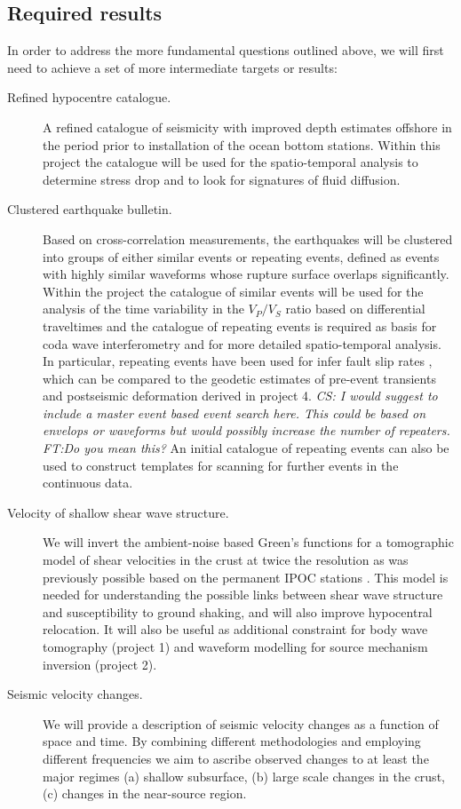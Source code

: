 \documentclass[11pt]{article}
\newcommand{\note}[1]{{\it \color{red} #1}}
\newcommand{\noteft}[1]{{\it \color{magenta} FT:#1}}
\newcommand{\note}[1]{}
\newcommand{\noteft}[1]{}
\begin{document}
\subsection*{Required results}
In order to address the more fundamental questions outlined above, we will first need to achieve a set of more intermediate targets or results:
\begin{description}
 \item[Refined hypocentre catalogue.] A refined catalogue of seismicity with improved depth estimates offshore in the period prior to installation of the ocean bottom stations.  Within this project the catalogue will be used for the spatio-temporal analysis to determine stress drop and to look for signatures of fluid diffusion.
 \item[Clustered earthquake bulletin.] Based on cross-correlation measurements, the earthquakes will be clustered into groups of either similar events or repeating events, defined as events with highly similar waveforms whose rupture surface overlaps significantly. Within the project the catalogue of similar events will be used for the analysis of the time variability in the $V_P/V_S$ ratio based on differential traveltimes and the catalogue of repeating events is required as basis for coda wave interferometry and for more detailed spatio-temporal analysis. In particular, repeating events have been used for infer fault slip rates \citep{nadeau:1998,uchida04}, which can be compared to the  geodetic estimates of pre-event transients and postseismic deformation derived in project 4. \note{CS: I would suggest to include a master event based event search here. This could be based on envelops or waveforms but would possibly increase the number of repeaters.}\noteft{Do you mean this?} An initial catalogue of repeating events can also be used to construct templates for scanning for further events in the continuous data. 
 \item[Velocity of shallow shear wave structure.] We will invert the ambient-noise based Green's functions for a tomographic model of shear velocities in the crust at twice the resolution as was previously possible based on the permanent IPOC stations \citep{ward13}. This model is needed for understanding the possible links between shear wave structure and susceptibility to ground shaking, and will also improve hypocentral relocation. It will also be useful as additional constraint for body wave tomography (project 1) and waveform modelling for source mechanism inversion (project 2). 
\item[Seismic velocity changes.] We will provide a description of seismic velocity changes as a function of space and time. By combining different methodologies and employing different frequencies we aim to ascribe observed changes to at least the major regimes (a) shallow subsurface, (b) large scale changes in the crust, (c) changes in the near-source region.   
\end{description}
\end{document}
